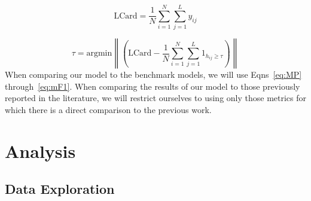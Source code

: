 \documentclass[12pt,journal,compsoc]{IEEEtran}
\begin{document}
\begin{equation}
\mathrm{LCard} = \frac{1}{N}\sum_{i=1}^{N}\sum_{j=1}^{L}y_{ij}
\end{equation}

\begin{equation}
\tau = \mathrm{argmin}\left\|\left(\mathrm{LCard}-\frac{1}{N}\sum_{i=1}^{N}\sum_{j=1}^{L}1_{h_{ij} \geq \tau}\right)\right\|
\end{equation}
When comparing our model to the benchmark models, we will use Eqns~\ref{eq:MP} through~\ref{eq:mF1}. When comparing the results of our model to those previously reported in the literature, we will restrict ourselves to using only those metrics for which there is a direct comparison to the previous work.


\section{Analysis} %
\subsection{Data Exploration}

\end{document}
